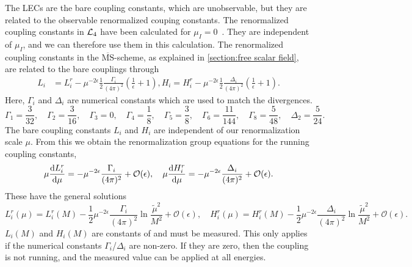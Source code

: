 The LECs are the bare coupling constants, which are unobservable, but they are related to the observable renormalized couping constants.
The renormalized coupling constants in $\mathcal{L}_4$ have been calculated for $\mu_I = 0$~\autocite{gasserChiralPerturbationTheory1985}.
They are independent of $\mu_I$, and we can therefore use them in this calculation.
The renormalized coupling constants in the $\overline{\mathrm{MS}}$-scheme, as explained in \autoref{section:free scalar field}, are related to the bare couplings through
\begin{align}
    L_i 
    & = 
    L_i^r 
    - \mu^{-2\epsilon}\frac{1}{2} \frac{\Gamma_i}{(4 \pi)^2} 
    \left(\frac{1}{\epsilon} + 1 \right),
    H_i = 
    H_i^r
    - \mu^{-2\epsilon} \frac{1}{2}  \frac{\Delta_i }{(4 \pi)^2} 
    \left(\frac{1}{\epsilon} + 1 \right).
\end{align}
%
Here, $\Gamma_i$ and $\Delta_i$ are numerical constants which are used to match the divergences.
\begin{equation}
    \Gamma_1 = \frac{3}{32}, \quad
    \Gamma_2 = \frac{3}{16}, \quad
    \Gamma_3 = 0, \quad
    \Gamma_4 = \frac{1}{8}, \quad
    \Gamma_5 = \frac{3}{8}, \quad
    \Gamma_6 = \frac{11}{144}, \quad
    \Gamma_8 = \frac{5}{48}, \quad
    \Delta_2 = \frac{5}{24}.
\end{equation}
%
The bare coupling constants $L_i$ and $H_i$ are independent of our renormalization scale $\mu$.
From this we obtain the renormalization group equations for the running coupling constants,
\begin{equation}
    \mu \diff{L_i^r}{\mu } 
    = - \mu^{-2\epsilon} \frac{\Gamma_i }{(4 \pi)^2} + \mathcal{O}(\epsilon), \quad
    \mu \diff{H_i^r}{\mu } 
    = -  \mu^{-2\epsilon}\frac{\Delta_i}{(4 \pi)^2}+ \mathcal{O}(\epsilon).
\end{equation}
%
These have the general solutions
%
\begin{equation}
    L_i^r(\mu)
    = 
    L_i^r(M)
    - \frac{1}{2} \mu^{-2\epsilon} \frac{\Gamma_i}{(4 \pi)^2} 
    \ln{\frac{\tilde \mu^2}{M^2}} + \mathcal{O}(\epsilon),
    \quad
    H_i^r (\mu)
    = 
    H_i^r (M)
    - \frac{1}{2} \mu^{-2\epsilon} \frac{\Delta_i}{(4 \pi)^2} 
    \ln{\frac{\tilde \mu^2}{M^2}} + \mathcal{O}(\epsilon).
\end{equation}
%
$L_i(M)$ and $H_i(M)$ are constants of and must be measured.
This only applies if the numerical constants $\Gamma_i$/$\Delta_i$ are non-zero.
If they are zero, then the coupling is not running, and the measured value can be applied at all energies.
